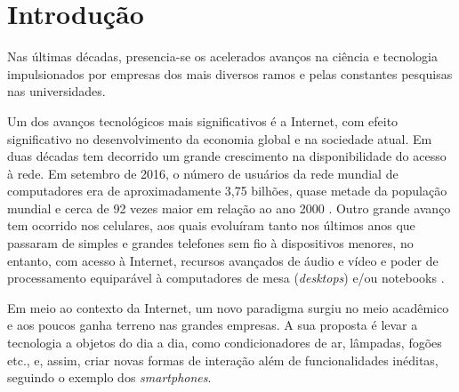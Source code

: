 \chapter{Introdução}

Nas últimas décadas, presencia-se os acelerados avanços na ciência e tecnologia impulsionados por empresas dos mais diversos ramos e pelas constantes pesquisas nas universidades. 

Um dos avanços tecnológicos mais significativos é a Internet, com efeito significativo no desenvolvimento da economia global e na sociedade atual. Em duas décadas tem decorrido um grande crescimento na disponibilidade do acesso à rede. Em setembro de 2016, o número de usuários da rede mundial de computadores era de aproximadamente 3,75 bilhões, quase metade da população mundial e cerca de 92 vezes maior em relação ao ano 2000 \cite{MiniwattsMarketingGroup2016}.  Outro grande avanço tem ocorrido nos celulares, aos quais evoluíram tanto nos últimos anos que passaram de simples e grandes telefones sem fio à dispositivos menores, no entanto, com acesso à Internet, recursos avançados de áudio e vídeo e poder de processamento equiparável à computadores de mesa (\textit{desktops}) e/ou notebooks \cite{Meyers2011, Woyke2014}.

Em meio ao contexto da Internet, um novo paradigma surgiu no meio acadêmico e aos poucos ganha terreno nas grandes empresas. A sua proposta é levar a tecnologia a objetos do dia a dia, como condicionadores de ar, lâmpadas, fogões etc., e, assim, criar novas formas de interação além de funcionalidades inéditas, seguindo o exemplo dos \textit{smartphones}. 


